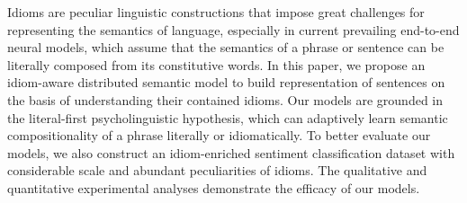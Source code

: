Idioms are peculiar linguistic constructions that impose great challenges for representing the semantics of language, especially in current prevailing end-to-end neural models, which assume that the semantics of a phrase or sentence can be literally composed from its constitutive words. In this paper, we propose an idiom-aware distributed semantic model to build representation of sentences on the basis of understanding their contained idioms. Our models are grounded in the literal-first psycholinguistic hypothesis, which can adaptively learn semantic compositionality of a phrase literally or idiomatically. To better evaluate our models, we also construct an idiom-enriched sentiment classification dataset with considerable scale and abundant peculiarities of idioms. The qualitative and quantitative experimental analyses demonstrate the efficacy of our models.
